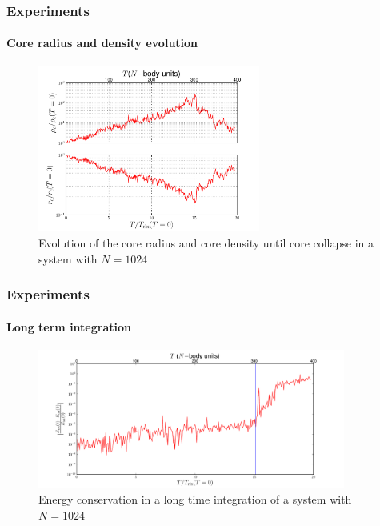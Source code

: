 \begin{frame}
    \frametitle{Experiments}
    \framesubtitle{Core radius and density evolution}

\begin{figure}[H]
    \centering
    \label{fig:core_p_r}
    \includegraphics[width=0.65\textwidth]{img/test_density_core-radius_tcc_1k.pdf}
    \caption{Evolution of the core radius and core density until core collapse
             in a system with $N=1024$}
\end{figure}

\end{frame}
\begin{frame}
    \frametitle{Experiments}
    \framesubtitle{Long term integration}

\begin{figure}[h!t]
    \centering
    \label{fig:energy}
    \includegraphics[width=0.9\textwidth]{img/test_energy-conservation_1k-400t.pdf}
    \caption{Energy conservation in a long time integration of a system with
             $N=1024$}
\end{figure}

\end{frame}
%
%
